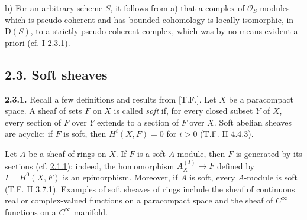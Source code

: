 b) For an arbitrary scheme $S$, it follows from a) that a complex of $\mathcal O_S$-modules which is pseudo-coherent and has bounded cohomology is locally isomorphic, in $\mathrm D(S)$, to a strictly pseudo-coherent complex, which was by no means evident a priori (cf. \hyperlink{sga6.e01.rem.2-3-1}{I 2.3.1}).

\subsection*{2.3. Soft sheaves}

\textbf{2.3.1.} Recall a few definitions and results from [T.F.]. Let $X$ be a paracompact space. A sheaf of sets $F$ on $X$ is called \emph{soft} if, for every closed subset $Y$ of $X$, every section of $F$ over $Y$ extends to a section of $F$ over $X$. Soft abelian sheaves are acyclic: if $F$ is soft, then $H^i(X,F)=0$ for $i>0$ (T.F. II 4.4.3).

Let $A$ be a sheaf of rings on $X$. If $F$ is a soft $A$-module, then $F$ is generated by its sections (cf. \hyperlink{sga6.e02.lem.2-1-1}{2.1.1}): indeed, the homomorphism $A_X^{(I)}\to F$ defined by $I=H^0(X,F)$ is an epimorphism. Moreover, if $A$ is soft, every $A$-module is soft (T.F. II 3.7.1). Examples of soft sheaves of rings include the sheaf of continuous real or complex-valued functions on a paracompact space and the sheaf of $C^\infty$ functions on a $C^\infty$ manifold.

